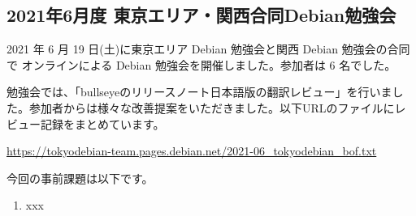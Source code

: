 \documentclass[mingoth,a4paper]{jsarticle}
\begin{document}

\subsection{2021年6月度 東京エリア・関西合同Debian勉強会}

2021 年 6 月 19 日(土)に東京エリア Debian 勉強会と関西 Debian 勉強会の合同で
オンラインによる Debian 勉強会を開催しました。参加者は 6 名でした。

勉強会では、「bullseyeのリリースノート日本語版の翻訳レビュー」を行いました。参加者からは様々な改善提案をいただきました。以下URLのファイルにレビュー記録をまとめています。

\url{https://tokyodebian-team.pages.debian.net/2021-06_tokyodebian_bof.txt}



今回の事前課題は以下です。

\begin{enumerate}
  \item xxx
\end{enumerate}


\begin{multicols}{2}
{\small
  
}
\end{multicols}

%
%
%
% 





\end{document}
